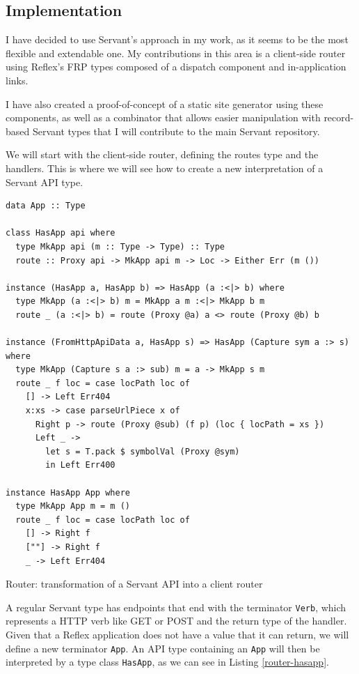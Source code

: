 \documentclass[english,zadani,odsaz]{fitthesis}
\begin{document}
\subsection{Implementation}
\label{sec:org63d6b5d}
I have decided to use Servant's approach in my work, as it seems to be the most
flexible and extendable one. My contributions in this area is a client-side
router using Reflex's FRP types composed of a dispatch component and
in-application links.

I have also created a proof-of-concept of a static site generator using these
components, as well as a combinator that allows easier manipulation with
record-based Servant types that I will contribute to the main Servant
repository.

We will start with the client-side router, defining the routes type and the
handlers. This is where we will see how to create a new interpretation of a
Servant API type.

\begin{listing}[!t]
\begin{verbatim}
data App :: Type

class HasApp api where
  type MkApp api (m :: Type -> Type) :: Type
  route :: Proxy api -> MkApp api m -> Loc -> Either Err (m ())

instance (HasApp a, HasApp b) => HasApp (a :<|> b) where
  type MkApp (a :<|> b) m = MkApp a m :<|> MkApp b m
  route _ (a :<|> b) = route (Proxy @a) a <> route (Proxy @b) b

instance (FromHttpApiData a, HasApp s) => HasApp (Capture sym a :> s) where
  type MkApp (Capture s a :> sub) m = a -> MkApp s m
  route _ f loc = case locPath loc of
    [] -> Left Err404
    x:xs -> case parseUrlPiece x of
      Right p -> route (Proxy @sub) (f p) (loc { locPath = xs })
      Left _ ->
        let s = T.pack $ symbolVal (Proxy @sym)
        in Left Err400

instance HasApp App where
  type MkApp App m = m ()
  route _ f loc = case locPath loc of
    [] -> Right f
    [""] -> Right f
    _ -> Left Err404
\end{verbatim}
\caption{Router: transformation of a Servant API into a client router \label{router-hasapp}}
\end{listing}

A regular Servant type has endpoints that end with the terminator \texttt{Verb}, which
represents a HTTP verb like GET or POST and the return type of the
handler. Given that a Reflex application does not have a value that it can
return, we will define a new terminator \texttt{App}. An API type containing an \texttt{App} will
then be interpreted by a type class \texttt{HasApp}, as we can see in Listing
\ref{router-hasapp}.
\end{document}
